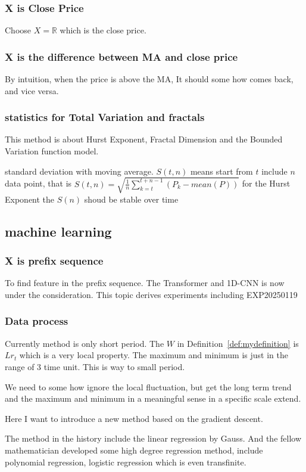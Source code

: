 \documentclass{article}
\theoremstyle{definition} %
\begin{document}
\subsubsection{X is Close Price}
Choose $X=\mathbb{R}$ which is the close price.
\subsubsection{X is the difference between MA and close price}
By intuition, when the price is above the MA,
It should some how comes back, and vice versa.
\subsubsection{statistics for Total Variation and fractals}
This method is about Hurst Exponent,
Fractal Dimension and the Bounded Variation
function model.

standard deviation with moving average.
$S(t,n)$ means start from
$t$ include $n$ data point,
that is
$S(t,n)=\sqrt{\frac{1}{n}\sum_{k=t}^{t+n-1}
        \left(P_k-mean(P)\right)}$
for the Hurst Exponent the $S(n)$ shoud be
stable over time

\subsection{machine learning}
\subsubsection{X is prefix sequence}
To find feature in the prefix sequence. The
Transformer and 1D-CNN is now under
the consideration.
This topic derives experiments including
EXP20250119

\subsubsection{Data process}
Currently method is only short period.
The $W$ in Definition~\ref{def:mydefinition}
is $Lr_t$ which is a very local property.
The maximum and minimum is just in the range
of $3$ time unit. This is way to small period.

We need to some how ignore the local fluctuation,
but get the long term trend and the maximum
and minimum in a meaningful sense in
a specific scale extend.

Here I want to introduce a new method based
on the gradient descent.

The method in the history include the
linear regression by Gauss. And the fellow
mathematician developed some high degree
regression method, include polynomial regression,
logistic regression which is even transfinite.
\end{document}
